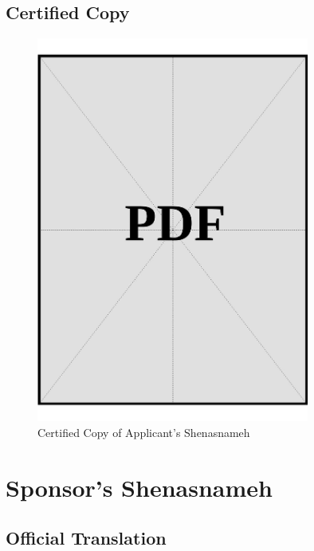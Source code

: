 \clearpage
\subsection*{Certified Copy}
\vspace*{\fill}
\begin{figure}[h]
    \centering
    \includegraphics[page=1, width=0.8\textwidth]{../docs/applicant/identification/shenasnameh/certified-copies.pdf}
    \caption{Certified Copy of Applicant's Shenasnameh}
    \label{fig:applicant-shenasnameh-certified-copy}
\end{figure}
\vspace*{\fill}

\clearpage


\section{Sponsor's Shenasnameh}\label{sec:sponsor-shenasnameh}

\subsection*{Official Translation}
\vspace*{\fill}

